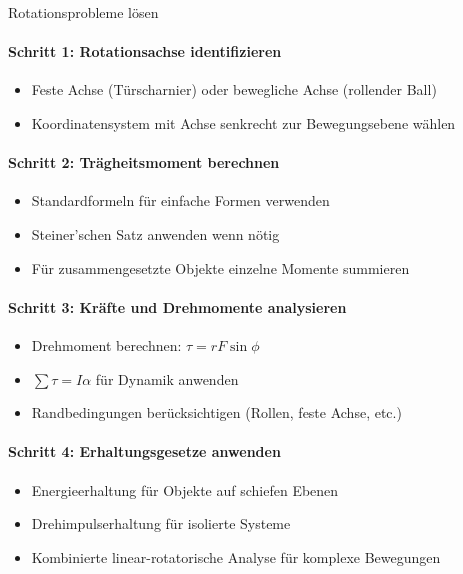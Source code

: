 \begin{KR}{Rotationsprobleme lösen}
    \paragraph{Schritt 1: Rotationsachse identifizieren}
    \begin{itemize}
        \item Feste Achse (Türscharnier) oder bewegliche Achse (rollender Ball)
        \item Koordinatensystem mit Achse senkrecht zur Bewegungsebene wählen
    \end{itemize}
    
    \paragraph{Schritt 2: Trägheitsmoment berechnen}
    \begin{itemize}
        \item Standardformeln für einfache Formen verwenden
        \item Steiner'schen Satz anwenden wenn nötig
        \item Für zusammengesetzte Objekte einzelne Momente summieren
    \end{itemize}
    
    \paragraph{Schritt 3: Kräfte und Drehmomente analysieren}
    \begin{itemize}
        \item Drehmoment berechnen: $\tau = rF\sin\phi$
        \item $\sum \tau = I\alpha$ für Dynamik anwenden
        \item Randbedingungen berücksichtigen (Rollen, feste Achse, etc.)
    \end{itemize}
    
    \paragraph{Schritt 4: Erhaltungsgesetze anwenden}
    \begin{itemize}
        \item Energieerhaltung für Objekte auf schiefen Ebenen
        \item Drehimpulserhaltung für isolierte Systeme
        \item Kombinierte linear-rotatorische Analyse für komplexe Bewegungen
    \end{itemize}
\end{KR}

